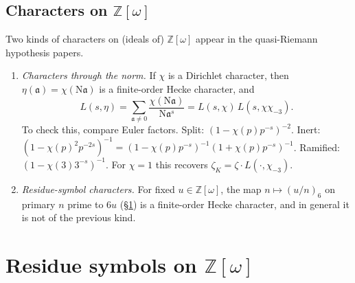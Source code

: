 \documentclass[11pt]{article}
\numberwithin{equation}{section}
\newcommand{\N}{\mathrm N}
\newcommand{\OO}{\mathbb Z[\omega]}
\newcommand{\ch}{\chi_{-3}}
\theoremstyle{definition}
\theoremstyle{remark}
\begin{document}
\subsection{Characters on \texorpdfstring{$\OO$}{Z[omega]}}\label{sec:characters}
Two kinds of characters on (ideals of) $\OO$ appear in the quasi-Riemann hypothesis papers.
\begin{enumerate}
\item \emph{Characters through the norm.} If $\chi$ is a Dirichlet character, then $\eta(\mathfrak a)=\chi(\N\mathfrak a)$ is a
finite-order Hecke character, and
\begin{equation}\label{eq:normchar}
 L(s,\eta)=\sum_{\mathfrak a\ne0}\frac{\chi(\N\mathfrak a)}{\N\mathfrak a^s}=L(s,\chi)\,L(s,\chi\ch).
\end{equation}
To check this, compare Euler factors. Split: $(1-\chi(p)p^{-s})^{-2}$. Inert:
$(1-\chi(p)^2p^{-2s})^{-1}=(1-\chi(p)p^{-s})^{-1}(1+\chi(p)p^{-s})^{-1}$. Ramified:
$(1-\chi(3)3^{-s})^{-1}$. For $\chi=1$ this recovers $\zeta_K=\zeta\cdot L(\cdot,\ch)$.
\item \emph{Residue-symbol characters.} For fixed $u\in\OO$, the map $n\mapsto(u/n)_6$ on primary $n$
prime to $6u$ (\S\ref{sec:symbols}) is a finite-order Hecke character, and in general it is not of the
previous kind.
\end{enumerate}

\section{Residue symbols on \texorpdfstring{$\OO$}{Z[omega]}}\label{sec:symbols}
\end{document}
